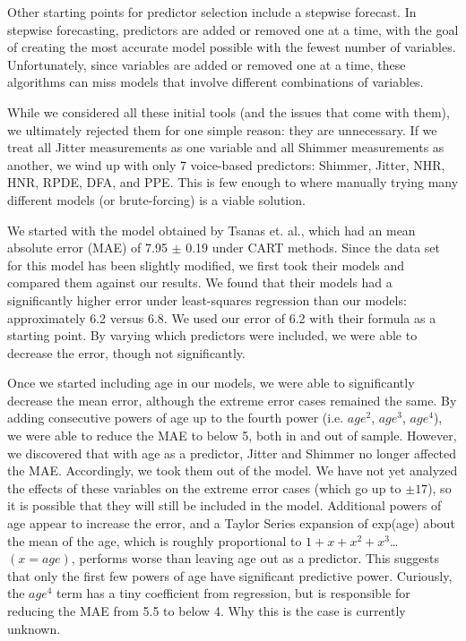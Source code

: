 \documentclass{report}
\begin{document}
Other starting points for predictor selection include a stepwise forecast. In stepwise forecasting, predictors are added or removed one at a time, with the goal of creating the most accurate model possible
with the fewest number of variables. Unfortunately, since variables are added or removed one at a time, these algorithms can miss models that involve different combinations of
variables.

While we considered all these initial tools (and the issues that come with them), we ultimately rejected them for one simple reason: they are unnecessary. If we treat all Jitter measurements as one variable
and all Shimmer measurements as another, we wind up with only 7 voice-based predictors: Shimmer, Jitter, NHR, HNR, RPDE, DFA, and PPE. This is few enough to where manually
trying many different models (or brute-forcing) is a viable solution.

We started with the model obtained by Tsanas et. al., which had an mean absolute error (MAE) of 7.95 $\pm$ 0.19 under CART methods. Since the data set for this model has been slightly modified,
we first took their models and compared them against our results. We found that their models had a significantly higher error under least-squares regression than our models:
approximately 6.2 versus 6.8. We used our error of 6.2 with their formula as a starting point. By varying which predictors were included, we were able to decrease the error,
though not significantly. 

Once we started including age in our models, we were able to significantly decrease the mean error, although the extreme error cases remained the same. By adding consecutive 
powers of age up to the fourth power (i.e. $age^2$, $age^3$, $age^4$), we were able to reduce the MAE to below 5, both in and out of sample. However, we
discovered that with age as a predictor, Jitter and Shimmer no longer affected the MAE. Accordingly, we took them out of the model. We have not yet analyzed the effects of these
variables on the extreme error cases (which go up to $\pm17$), so it is possible that they will still be included in the model. Additional powers of age appear to increase the error,
and a Taylor Series expansion of exp(age) about the mean of the age, which is roughly proportional to $1 + x  + x^2 + x^3 $\dots$ (x = age)$, performs worse than leaving age out as a 
predictor. This suggests that only the first few powers of age have significant predictive power. Curiously, the $age^4$ term has a tiny coefficient from regression, but is responsible
for reducing the MAE from 5.5 to below 4. Why this is the case is currently unknown.
\end{document}
